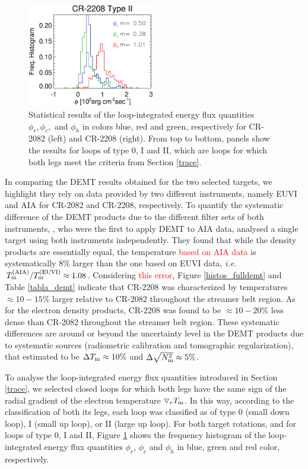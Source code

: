 \documentclass[namedreferences]{solarphysics}
\def\edit#1{\textcolor{Red}{#1}}
\newcommand{\dr}{\triangledown_r}
\newcommand{\Tm}{T_{\rm m}}
\newcommand{\Nsqm}{N^2_{{\rm m}}}
\newcommand{\sqravgN}{\sqrt{\Nsqm}}
\begin{document}
\begin{article}
\begin{figure}[h!]
\begin{center}
\includegraphics[width=0.495\textwidth]{figs/histocr2208_cgenergia.eps}
\caption{{Statistical results of the loop-integrated energy flux quantities $\phi_r,\phi_c,$ and $\phi_h$ in colors blue, red and green, respectively for CR-2082 (left) and CR-2208 (right). From top to bottom, panels show the results for loops of type 0, I and II, which are loops for which both legs meet the criteria from Section \ref{trace}.}}
\label{energia_demt}
\end{center}
\end{figure} 

In comparing the DEMT results obtained for the two selected targets, {we highlight} they rely on data provided by two different instruments, {namely EUVI and AIA for CR-2082 and CR-2208, respectively.} To quantify the systematic difference of the DEMT products {due to the different filter sets of} both instruments, \citet{nuevo_2015}, who were the first to apply DEMT to AIA data, {analysed} a single target using both instruments independently. They found that while the density {products are} essentially equal, the temperature \edit{based on AIA data} is systematically 8\% larger than the one based on EUVI data, \textit{i.e.} $\Tm^{\rm(AIA)}/\Tm^{\rm(EUVI)} \approx 1.08$. Considering \edit{this error}, Figure \ref{histos_fulldemt} and Table \ref{tabla_demt} indicate that CR-2208 was {characterized by temperatures $\approx 10-15\%$ larger relative to CR-2082} throughout the streamer belt region. As for the electron density products, CR-2208 was found to be $\approx 10-20\%$ less dense than CR-2082 throughout the streamer belt region. These systematic differences are {around or beyond the uncertainty level in the DEMT products due to systematic sources (radiometric calibration and tomographic regularization), that \citet{lloveras_2017} {estimated to be $\Delta\Tm\approx 10\%$ and $\Delta\sqravgN\approx 5\%$}.}

{To analyse the loop-integrated energy flux quantities introduced in Section \ref{trace}, we selected closed loops for which both legs have the same sign of the radial gradient of the electron temperature $\dr\Tm$.} In this way, according to the classification of both its legs, each loop was classified as of type 0 (small down loop), I (small up loop), or II (large up loop). {For both target rotations, and for loops of type 0, I and II, Figure \ref{energia_demt} shows the frequency histogram of the loop-integrated energy flux quantities {$\phi_r$, $\phi_c$ and $\phi_h$ in blue, green and red color}, respectively.}


\end{article}
\end{document}
